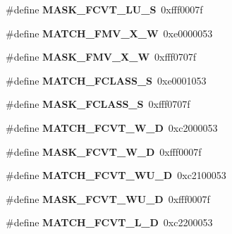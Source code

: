 \begin{DoxyCompactItemize}
\item 
\mbox{\label{riscv-utility_8h_aeaa317e69d61b111c2affaf42d8ba5d9}} 
\#define {\bfseries M\+A\+S\+K\+\_\+\+F\+C\+V\+T\+\_\+\+L\+U\+\_\+S}~0xfff0007f
\item 
\mbox{\label{riscv-utility_8h_a4391da85a13e9bf7aa3b308c2d6ce117}} 
\#define {\bfseries M\+A\+T\+C\+H\+\_\+\+F\+M\+V\+\_\+\+X\+\_\+W}~0xe0000053
\item 
\mbox{\label{riscv-utility_8h_a1f175a4d0c74cfcc3b7e3be120ccf8f5}} 
\#define {\bfseries M\+A\+S\+K\+\_\+\+F\+M\+V\+\_\+\+X\+\_\+W}~0xfff0707f
\item 
\mbox{\label{riscv-utility_8h_a2cc01782438266ec9d29ca15b9170ac3}} 
\#define {\bfseries M\+A\+T\+C\+H\+\_\+\+F\+C\+L\+A\+S\+S\+\_\+S}~0xe0001053
\item 
\mbox{\label{riscv-utility_8h_a1e9d304389477ba277b5292b3e3660bb}} 
\#define {\bfseries M\+A\+S\+K\+\_\+\+F\+C\+L\+A\+S\+S\+\_\+S}~0xfff0707f
\item 
\mbox{\label{riscv-utility_8h_a28ef211426ab46598e31fdbc766c7f14}} 
\#define {\bfseries M\+A\+T\+C\+H\+\_\+\+F\+C\+V\+T\+\_\+\+W\+\_\+D}~0xc2000053
\item 
\mbox{\label{riscv-utility_8h_aa5359ec3e358570d09e1cb0f4bd6820e}} 
\#define {\bfseries M\+A\+S\+K\+\_\+\+F\+C\+V\+T\+\_\+\+W\+\_\+D}~0xfff0007f
\item 
\mbox{\label{riscv-utility_8h_a3dc64c717cb0730bb7cd3fabf5f57b99}} 
\#define {\bfseries M\+A\+T\+C\+H\+\_\+\+F\+C\+V\+T\+\_\+\+W\+U\+\_\+D}~0xc2100053
\item 
\mbox{\label{riscv-utility_8h_a9bd2be9597d013ce7d911b1557bc8875}} 
\#define {\bfseries M\+A\+S\+K\+\_\+\+F\+C\+V\+T\+\_\+\+W\+U\+\_\+D}~0xfff0007f
\item 
\mbox{\label{riscv-utility_8h_aa7b7544f1ba88a444c456db8e11e445a}} 
\#define {\bfseries M\+A\+T\+C\+H\+\_\+\+F\+C\+V\+T\+\_\+\+L\+\_\+D}~0xc2200053
\item 

\end{DoxyCompactItemize}
